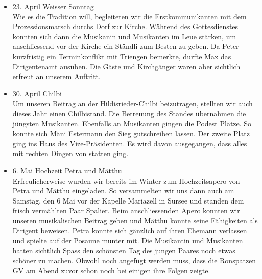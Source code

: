 \begin{history}
\begin{itemize}
            \item 23. April Weisser Sonntag\\
                  Wie es die Tradition will, begleiteten wir die Erstkommunikanten
                  mit dem Prozessionsmarsch durchs Dorf zur Kirche. Während des
                  Gottesdienstes konnten sich dann die Musikanin und Musikanten im
                  Leue stärken, um anschliessend vor der Kirche ein Ständli zum
                  Besten zu geben. Da Peter kurzfristig ein Terminkonflikt mit
                  Triengen bemerkte, durfte Max das Dirigentenamt ausüben. Die Gäste
                  und Kirchgänger waren aber sichtlich erfreut an unserem Auftritt.


            \item 30. April Chilbi\\
                  Um unseren Beitrag an der Hildisrieder-Chilbi beizutragen,
                  stellten wir auch dieses Jahr einen Chilbistand. Die Betreuung des
                  Standes übernahmen die jüngsten Musikanten. Ebenfalls an
                  Musikanten gingen die Podest Plätze. So konnte sich Mäni Estermann
                  den Sieg gutschreiben lassen. Der zweite Platz ging ins Haus des
                  Vize-Präsidenten. Es wird davon ausgegangen, dass alles mit
                  rechten Dingen von statten ging.

            \item  6. Mai Hochzeit Petra und Mätthu\\
                  Erfreulicherweise wurden wir bereits im Winter zum Hochzeitsapero
                  von Petra und Mätthu eingeladen. So versammelten wir uns dann auch
                  am Samstag, den 6 Mai vor der Kapelle Mariazell in Sursee und
                  standen dem frisch vermählten Paar Spalier. Beim anschliessenden
                  Apero konnten wir unseren musikalischen Beitrag geben und Mätthu
                  konnte seine Fähigkeiten als Dirigent beweisen. Petra konnte sich
                  gänzlich auf ihren Ehemann verlassen und spielte auf der Posaune
                  munter mit. Die Musikantin und Musikanten hatten sichtlich Spass
                  den schönsten Tag des jungen Paares noch etwas schöner zu machen.
                  Obwohl noch angefügt werden muss, dass die Ronspatzen GV am Abend
                  zuvor schon noch bei einigen ihre Folgen zeigte.


\end{itemize}
\end{history}
